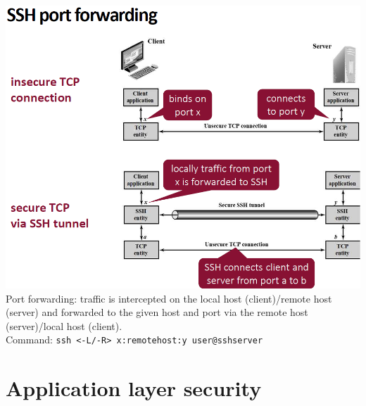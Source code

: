 \documentclass[12pt]{article}
\begin{document}
 \includegraphics[width=0.8\linewidth]{./slides/L7P4SSHPORT.PNG}\\
 Port forwarding: traffic is intercepted on the local host (client)/remote host (server) and forwarded to the given host and port via the remote host (server)/local host (client). \\
 Command: \texttt{ssh <-L/-R> x:remotehost:y user@sshserver}
 
 \newpage
 \section{Application layer security}
\end{document}
